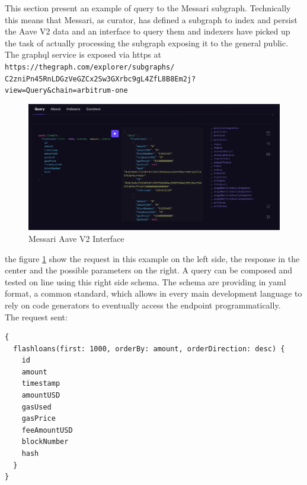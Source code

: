 \documentclass[11pt,a4paper,titlepage]{scrartcl}
\begin{document}
This section present an example of query to the Messari subgraph. Technically this means that Messari, as curator, has defined a subgraph to index and persist the Aave V2 data and an interface to query them and indexers have picked up the task of actually processing the subgraph exposing it to the general public. 
The graphql service is exposed via https at \\

\texttt{https://thegraph.com/explorer/subgraphs/\break
C2zniPn45RnLDGzVeGZCx2Sw3GXrbc9gL4ZfL8B8Em2j?\break
view=Query\&chain=arbitrum-one}

\begin{figure}[ht]
    \centering %
    \includegraphics[width=\textwidth]{image/process/messari.png} %
    \caption{Messari Aave V2 Interface}
    \label{fig:aavemessari}
\end{figure}

\vspace{0.5cm} %

the figure \ref{fig:aavemessari} show the request in this example on the left side, the response in the center and the possible parameters on the right. A query can be composed and tested  on line using this  right side schema. The schema are providing in yaml format, a common standard, which allows in every main development language to rely on code generators to eventually access the endpoint programmatically.\\
The request sent:


\begin{lstlisting}[language=xml, caption={Example JSON request for flashloans}, label={lst:fl_example}, basicstyle=\ttfamily\scriptsize]
{
  flashloans(first: 1000, orderBy: amount, orderDirection: desc) {
    id
    amount
    timestamp
    amountUSD
    gasUsed
    gasPrice
    feeAmountUSD
    blockNumber
    hash
  }
}
\end{lstlisting}
  
\end{document}

